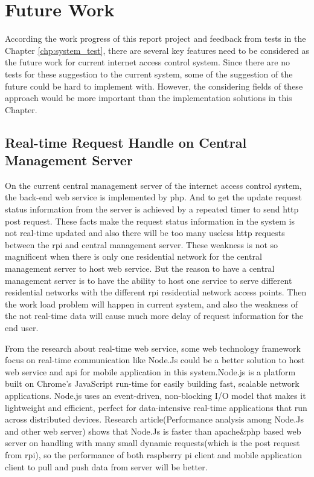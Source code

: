 \chapter{Future Work}
\label{chp:future_work}

\par According the work progress of this report project and feedback from tests in the Chapter \ref{chp:system_test}, there are several key features need to be considered as the future work for current internet access control system. Since there are no tests for these suggestion to the current system, some of the suggestion of the future could be hard to implement with. However, the considering fields of these approach would be more important than the implementation solutions in this Chapter.

\section{Real-time Request Handle on Central Management Server}
\par On the current central management server of the internet access control system, the back-end web service is implemented by \gls{php}. And to get the update request status information from the server is achieved by a repeated timer to send \gls{http} post request. These facts make the request status information in the system is not real-time updated and also there will be too many useless \gls{http} requests between the \gls{rpi} and central management server. These weakness is not so magnificent when there is only one residential network for the central management server to host web service. But the reason to have a central management server is to have the ability to host one service to serve different residential networks with the different \gls{rpi} residential network access points. Then the work load problem will happen in current system, and also the weakness of the not real-time data will cause much more delay of request information for the end user.
\par From the research about real-time web service, some web technology framework focus on real-time communication like Node.Js\cite{nodejs} could be a better solution to host web service and \gls{api} for mobile application in this system.Node.js is a platform built on Chrome's JavaScript run-time for easily building fast, scalable network applications. Node.js uses an event-driven, non-blocking I/O model that makes it lightweight and efficient, perfect for data-intensive real-time applications that run across distributed devices. Research article(Performance analysis among Node.Js and other web server)\cite{jsconf2010} shows that Node.Js is faster than apache\&php based web server on handling with many small dynamic requests(which is the post request from \gls{rpi}), so the performance of both raspberry pi client and mobile application client to pull and push data from server will be better.

